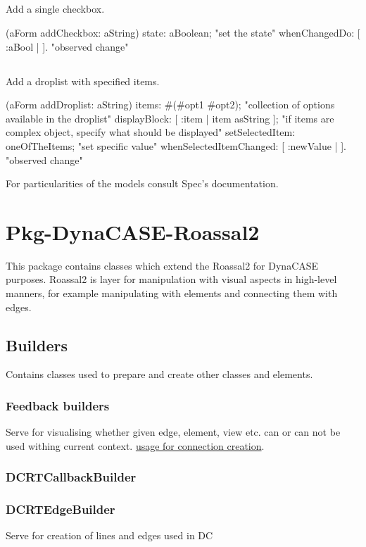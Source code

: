 \documentclass[a4paper,10pt,twoside]{book}
\begin{document}
\section{ }
Add a single checkbox.


\begin{code}{}
(aForm addCheckbox: aString)
	state: aBoolean; "set the state"
	whenChangedDo: [ :aBool | ]. "observed change"
\end{code}

\section{ }
Add a droplist with specified items.


\begin{code}{}
(aForm addDroplist: aString)
	items: #(#opt1 #opt2); "collection of options available in the droplist"
	displayBlock: [ :item | item asString ]; "if items are complex object, specify what should be displayed"
	setSelectedItem: oneOfTheItems; "set specific value"
	whenSelectedItemChanged: [ :newValue | ]. "observed change"
\end{code}


For particularities of the models consult Spec's documentation.
\chapter{ Pkg-DynaCASE-Roassal2}
This package contains classes which extend the Roassal2 for DynaCASE purposes.
Roassal2 is layer for manipulation with visual aspects in high-level manners, for example manipulating with elements and connecting them with edges.
\section{ Builders}
Contains classes used to prepare and create other classes and elements.
\subsection{ Feedback builders}
Serve for visualising whether given edge, element, view etc. can or can not be used withing current context.
\href{../figures/connection%20creation%20tool%20sequence.png}{usage for connection creation}.
\subsection{ DCRTCallbackBuilder}\subsection{ DCRTEdgeBuilder}
Serve for creation of lines and edges used in DC
\end{document}
